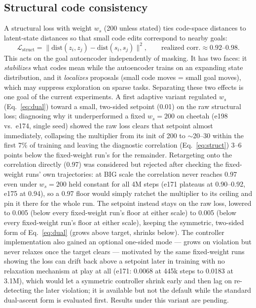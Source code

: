 \documentclass[10pt]{article}
\begin{document}
\subsection{Structural code consistency}
\label{sec:struct}
A structural loss with weight $w_s$ (200 unless stated) ties code-space
distances to latent-state distances so that small code edits correspond to
nearby goals:
\begin{equation}
\mathcal{L}_{\text{struct}} =
\big\| \mathrm{dist}(z_i, z_j) - \mathrm{dist}(s_i, s_j) \big\|^2 ,
\qquad \text{realized corr.} \approx 0.92\text{--}0.98 .
\label{eq:struct}
\end{equation}
This acts on the goal autoencoder independently of masking. It has two faces:
it \emph{stabilizes} what codes mean while the autoencoder trains on an
expanding state distribution, and it \emph{localizes} proposals (small code
moves = small goal moves), which may suppress exploration on sparse tasks.
Separating these two effects is one goal of the current experiments. A first
adaptive variant regulated $w_s$ (Eq.~\ref{eq:dual}) toward a small, two-sided
setpoint (0.01) on the raw structural loss; diagnosing why it underperformed a
fixed $w_s{=}200$ on cheetah (e198 vs.\ e174, single seed) showed the raw loss
clears that setpoint almost immediately, collapsing the multiplier from its
init of 200 to $\sim$20--30 within the first 7\% of training and leaving the
diagnostic correlation (Eq.~\ref{eq:struct}) 3--6 points below the fixed-weight
run's for the remainder. Retargeting onto the correlation directly (0.97) was
considered but rejected after checking the fixed-weight runs' own
trajectories: at BIG scale the correlation never reaches 0.97 even under
$w_s{=}200$ held constant for all 4M steps (e171 plateaus at 0.90--0.92, e175
at 0.94), so a 0.97 floor would simply ratchet the multiplier to its ceiling
and pin it there for the whole run. The setpoint instead stays on the raw
loss, lowered to 0.005 (below every fixed-weight run's floor at either scale)
to 0.005 (below every fixed-weight run's floor at either scale), keeping the
symmetric, two-sided form of Eq.~\eqref{eq:dual} (grows above target, shrinks
below). The controller implementation also gained an optional one-sided mode
--- grows on violation but never relaxes once the target clears --- motivated
by the same fixed-weight runs showing the loss can drift back above a setpoint
later in training with no relaxation mechanism at play at all (e171: 0.0068 at
445k steps to 0.0183 at 3.1M), which would let a symmetric controller shrink
early and then lag on re-detecting the later violation; it is available but
not the default while the standard dual-ascent form is evaluated first.
Results under this variant are pending.
\end{document}
